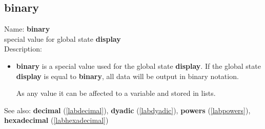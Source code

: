 \subsection{binary}
\label{labbinary}
\noindent Name: \textbf{binary}\\
special value for global state \textbf{display}\\
\noindent Description: \begin{itemize}

\item \textbf{binary} is a special value used for the global state \textbf{display}.  If
   the global state \textbf{display} is equal to \textbf{binary}, all data will be
   output in binary notation.
    
   As any value it can be affected to a variable and stored in lists.
\end{itemize}
See also: \textbf{decimal} (\ref{labdecimal}), \textbf{dyadic} (\ref{labdyadic}), \textbf{powers} (\ref{labpowers}), \textbf{hexadecimal} (\ref{labhexadecimal})
